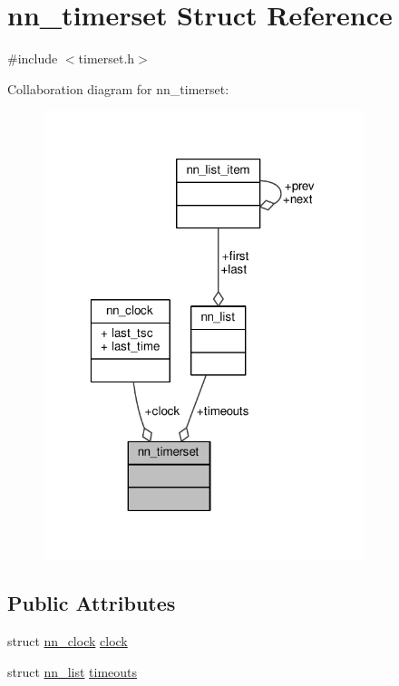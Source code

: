 \hypertarget{structnn__timerset}{}\section{nn\+\_\+timerset Struct Reference}
\label{structnn__timerset}


{\ttfamily \#include $<$timerset.\+h$>$}



Collaboration diagram for nn\+\_\+timerset\+:\nopagebreak
\begin{figure}[H]
\begin{center}
\leavevmode
\includegraphics[width=265pt]{structnn__timerset__coll__graph}
\end{center}
\end{figure}
\subsection*{Public Attributes}
\begin{DoxyCompactItemize}
\item 
struct \hyperlink{structnn__clock}{nn\+\_\+clock} \hyperlink{structnn__timerset_a5a3914bf199f9cf0091f3700cb94ea94}{clock}
\item 
struct \hyperlink{structnn__list}{nn\+\_\+list} \hyperlink{structnn__timerset_a7f956cb83b02643f85f83754b0a7ce41}{timeouts}
\end{DoxyCompactItemize}


